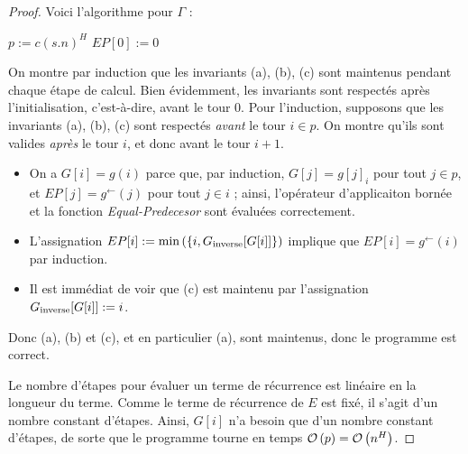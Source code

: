 \documentclass{article}
\begin{document}
\begin{proof}
{			Voici l'algorithme pour $\Gamma$ :
			
			\begin{algorithm}[H]
				
				
				$p := c(s.n)^H$ \;
				$EP[0] := 0$ \;
				
				
					
			\end{algorithm}
			
			On montre par induction que les invariants (a), (b), (c) sont maintenus pendant chaque étape de calcul. Bien évidemment, les invariants sont respectés après l'initialisation, c'est-à-dire, avant le tour $0$. 
			Pour l'induction, supposons que les invariants (a), (b), (c) sont respectés \emph{avant} le tour $i \in p$. On montre qu'ils sont valides \emph{après} le tour $i$, et donc avant le tour $i+1$. 
			
			\begin{itemize}
				\item 	On a $G[i] = g(i)$ parce que, par induction, $G[j] = g[j]_i$ pour tout $j \in p$, et $EP[j] = g^{\leftarrow}(j)$ pour tout $j \in i$ ; ainsi, l'opérateur d'applicaiton bornée et la fonction \emph{Equal-Predecesor} sont évaluées correctement.
				
				\item 	L'assignation $EP[i] := \min\left( \left\lbrace i, G_{\text{inverse}}[G[i]] \right\rbrace \right)$ implique que $EP[i] = g^{\leftarrow}(i)$ par induction.
				
				\item 	Il est immédiat de voir que (c) est maintenu par l'assignation $G_{\text{inverse}}[G[i]] := i$. 
			\end{itemize}
			
			Donc (a), (b) et (c), et en particulier (a), sont maintenus, donc le programme est correct.
			
			Le nombre d'étapes pour évaluer un terme de récurrence est linéaire en la longueur du terme. Comme le terme de récurrence de $E$ est fixé, il s'agit d'un nombre constant d'étapes. Ainsi, $G[i]$ n'a besoin que d'un nombre constant d'étapes, de sorte que le programme tourne en temps $\mathcal{O}\left( p \right) = \mathcal{O}\left( n^H \right)$.
			
			
}
			
			
			
		\end{proof}
	
\end{document}

